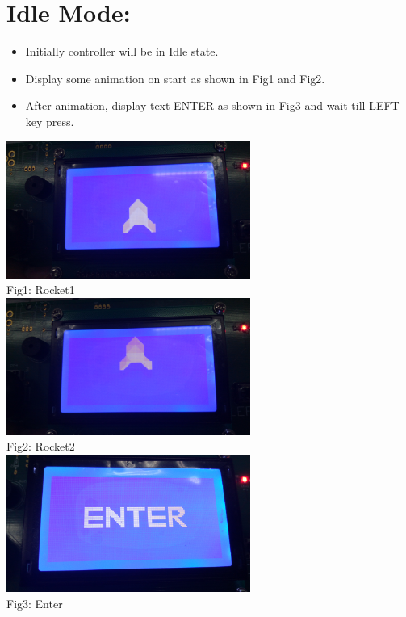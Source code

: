 \documentclass{article}
\begin{document}
\section{Idle Mode:}
\begin{itemize}
    \item Initially controller will be in Idle state.
    \item Display some animation on start as shown in Fig1 and Fig2.
    \item After animation, display text ENTER as shown in Fig3 and wait till LEFT key press.
\end{itemize}
\begin{center}
   \includegraphics[width=8cm]{rocket1}
   \\Fig1: Rocket1
   \\[2\baselineskip]
   \includegraphics[width=8cm]{rocket2}
   \\Fig2: Rocket2
   \\[2\baselineskip]

   \includegraphics[width=8cm]{Enter.png}
   \\Fig3: Enter
   \\[2\baselineskip]

 \end{center}
\end{document}
